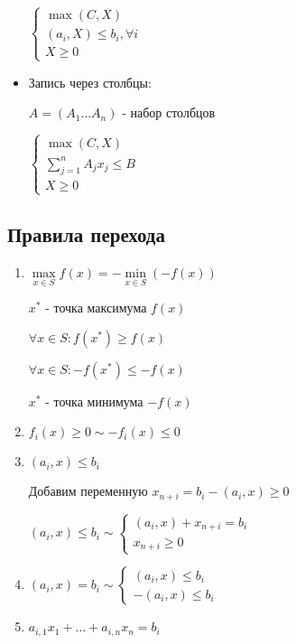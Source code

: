 \documentclass[11pt]{article}
\theoremstyle{break}
\begin{document}
\begin{sloppypar}
\begin{itemize}
$\begin{cases}
  \max (C, X) \\
  (a_i, X) \leq b_i, \forall i \\
  X \geq 0
\end{cases}$

\item Запись через столбцы:

$A = (A_1 \dots A_n)$ - набор столбцов

$\begin{cases}
  \max (C, X) \\
  \sum_{j = 1}^n A_j x_j \leq B \\
  X \geq 0
\end{cases}$
\end{itemize}

\subsection*{Правила перехода}
\begin{enumerate}
  \item $\max\limits_{x \in S} f(x) = - \min\limits_{x \in S} (- f(x))$
  
    $x^*$ - точка максимума $f(x)$
  
    $\forall x \in S: f(x^*) \geq f(x)$
  
    $\forall x \in S: - f(x^*) \leq - f(x)$
  
    $x^*$ - точка минимума $- f(x)$
  
  \item $f_i(x) \geq 0 \sim - f_i(x) \leq 0$
  
  \item $(a_i, x) \leq b_i$
  
    Добавим переменную $x_{n + i} = b_i - (a_i, x) \geq 0$
    
    $(a_i, x) \leq b_i \sim
    \begin{cases}
      (a_i, x) + x_{n + i} = b_i \\
      x_{n + i} \geq 0    
    \end{cases}$
    
  \item $(a_i, x) = b_i \sim
    \begin{cases}
      (a_i, x) \leq b_i \\
      - (a_i, x) \leq b_i
    \end{cases}$
    
  \item $a_{i, 1}x_1 + \dots + a_{i, n}x_n = b_i$
  

\end{enumerate}
\end{sloppypar}
\end{document}
